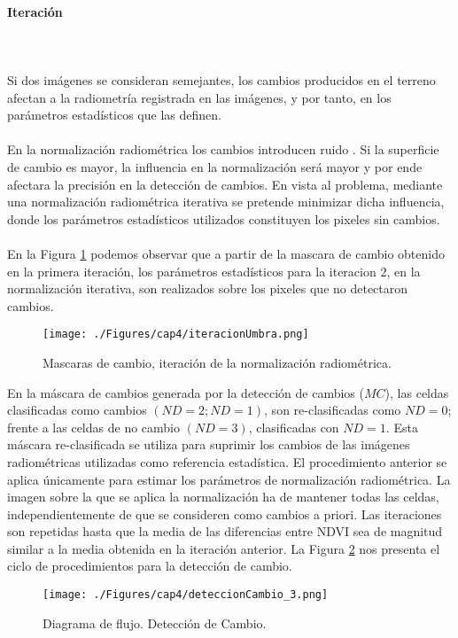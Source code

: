 \paragraph{Iteraci\'on}\label{subsec:iteracion}\mbox{}\\\mbox{}\\
 Si dos im\'agenes se consideran semejantes, los cambios producidos en el terreno afectan a la radiometr\'ia registrada en las im\'agenes, y por tanto, en los par\'ametros estad\'isticos que las definen.\\~\\
En la normalizaci\'on radiom\'etrica los cambios introducen ruido \cite{martinez2013normalizacion}. Si la superficie de cambio es mayor, la influencia en la normalizaci\'on ser\'a mayor y por ende afectara la precisi\'on en la detecci\'on de cambios. En vista al problema, mediante una normalizaci\'on radiom\'etrica iterativa se pretende minimizar dicha influencia, donde los par\'ametros estad\'isticos utilizados constituyen los pixeles sin cambios.\\~\\
En la Figura \ref{fig:iteracionRadiometrica} podemos observar que a partir de la mascara de cambio obtenido en la primera iteraci\'on, los par\'ametros estad\'isticos para la iteracion 2, en la normalizaci\'on iterativa, son realizados sobre los pixeles que no detectaron cambios. 
	\begin{figure}[H]
		\centering
		\texttt{[image: ./Figures/cap4/iteracionUmbra.png]}
		\caption{Mascaras de cambio, iteraci\'on de la normalizaci\'on radiom\'etrica.}
		\label{fig:iteracionRadiometrica}
	\end{figure}
En la m\'ascara de cambios generada por la detecci\'on de cambios ($ MC $), las celdas clasificadas como cambios $ (ND = 2; ND = 1) $, son re-clasificadas como $ ND=0 $; frente a las celdas de no cambio $(ND = 3)  $, clasificadas con $ ND=1 $. Esta m\'ascara re-clasificada se utiliza para suprimir los cambios de las im\'agenes radiom\'etricas utilizadas como referencia estad\'istica. El procedimiento anterior se aplica \'unicamente para estimar los par\'ametros de normalizaci\'on radiom\'etrica. La imagen sobre la que se aplica la normalizaci\'on ha de mantener todas las celdas, independientemente de que se consideren como cambios a priori. Las iteraciones son repetidas hasta que la media de las diferencias entre NDVI sea de magnitud similar a la media obtenida en la iteraci\'on anterior. La Figura \ref{fig:deteccionCambio} nos presenta el ciclo de procedimientos para la detecci\'on de cambio.
\begin{figure}[H]
	\centering
	\texttt{[image: ./Figures/cap4/deteccionCambio\_3.png]}
	\caption{Diagrama de flujo. Detecci\'on de Cambio.}
	\label{fig:deteccionCambio}
\end{figure}


